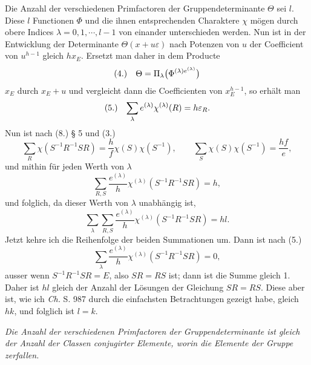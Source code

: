\documentclass[11pt]{article}
\makeatletter
\newcommand{\frobtagc}[2]{\[\begin{array}{@{}r@{\quad}c@{}}\textup{(#1)} & \displaystyle #2\end{array}\]}
\makeatother
\begin{document}
Die Anzahl der verschiedenen Primfactoren der Gruppendeterminante $\Theta$ sei $l$. Diese $l$ Functionen $\Phi$ und die ihnen entsprechenden Charaktere $\chi$ mögen durch obere Indices $\lambda=0,1,\cdots,l-1$ von einander unterschieden werden. Nun ist in der Entwicklung der Determinante $\Theta(x+u\varepsilon)$ nach Potenzen von $u$ der Coefficient von $u^{h-1}$ gleich $hx_E$. Ersetzt man daher in dem Producte
\frobtagc{4.}{\Theta=\Pi_\lambda\bigl(\Phi^{(\lambda)e^{(\lambda)}}\bigr)}
$x_E$ durch $x_E+u$ und vergleicht dann die Coefficienten von $x_E^{h-1}$, so erhält man
\frobtagc{5.}{\sum_\lambda e^{(\lambda)}\chi^{(\lambda)}(R)=h\varepsilon_R.}
Nun ist nach (8.) § 5 und (3.)
\[
\sum_R\chi(S^{-1}R^{-1}SR)=\frac{h}{f}\chi(S)\chi(S^{-1}),\qquad \sum_S\chi(S)\chi(S^{-1})=\frac{hf}{e},
\]
und mithin für jeden Werth von $\lambda$
\[
\sum_{R,S}\frac{e^{(\lambda)}}{h}\chi^{(\lambda)}(S^{-1}R^{-1}SR)=h,
\]
und folglich, da dieser Werth von $\lambda$ unabhängig ist,
\[
\sum_\lambda\sum_{R,S}\frac{e^{(\lambda)}}{h}\chi^{(\lambda)}(S^{-1}R^{-1}SR)=hl.
\]
Jetzt kehre ich die Reihenfolge der beiden Summationen um. Dann ist nach (5.)
\[
\sum_\lambda\frac{e^{(\lambda)}}{h}\chi^{(\lambda)}(S^{-1}R^{-1}SR)=0,
\]
ausser wenn $S^{-1}R^{-1}SR=E$, also $SR=RS$ ist; dann ist die Summe gleich 1. Daher ist $hl$ gleich der Anzahl der Lösungen der Gleichung $SR=RS$. Diese aber ist, wie ich \emph{Ch.} S. 987 durch die einfachsten Betrachtungen gezeigt habe, gleich $hk$, und folglich ist $l=k$.

\emph{Die Anzahl der verschiedenen Primfactoren der Gruppendeterminante ist gleich der Anzahl der Classen conjugirter Elemente, worin die Elemente der Gruppe zerfallen.}
\end{document}
